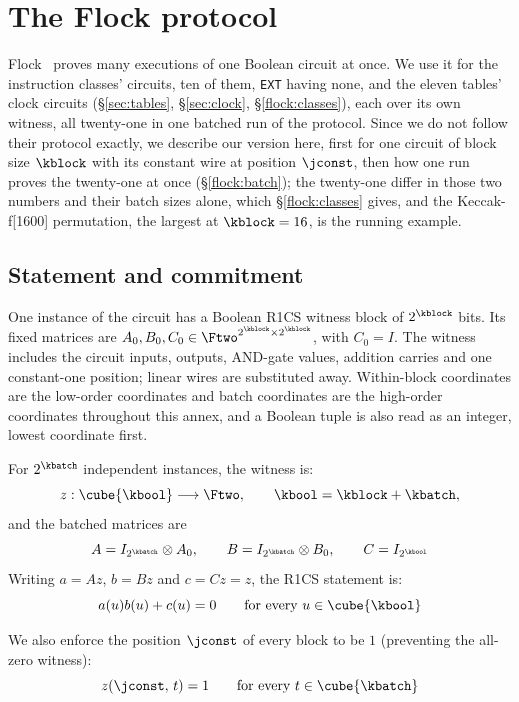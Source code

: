 \section{The Flock protocol}\label{annex:flock}

Flock~\cite{Flock26} proves many executions of one Boolean circuit at once. We use it for the instruction classes' circuits, ten of them, \texttt{EXT} having none, and the eleven tables' clock circuits (\S\ref{sec:tables}, \S\ref{sec:clock}, \S\ref{flock:classes}), each over its own witness, all twenty-one in one batched run of the protocol. Since we do not follow their protocol exactly, we describe our version here, first for one circuit of block size $\kblock$ with its constant wire at position $\jconst$, then how one run proves the twenty-one at once (\S\ref{flock:batch}); the twenty-one differ in those two numbers and their batch sizes alone, which \S\ref{flock:classes} gives, and the Keccak-f[1600] permutation, the largest at $\kblock=16$, is the running example.

\subsection{Statement and commitment}\label{flock:statement}

One instance of the circuit has a Boolean R1CS witness block of $2^{\kblock}$ bits. Its fixed matrices are $A_0,B_0,C_0\in\Ftwo^{2^{\kblock}\times 2^{\kblock}}$, with $C_0=I$. The witness includes the circuit inputs, outputs, AND-gate values, addition carries and one constant-one position; linear wires are substituted away. Within-block coordinates are the low-order coordinates and batch coordinates are the high-order coordinates throughout this annex, and a Boolean tuple is also read as an integer, lowest coordinate first.

For $2^{\kbatch}$ independent instances, the witness is:
\[
z:\cube{\kbool}\longrightarrow\Ftwo,\qquad \kbool=\kblock+\kbatch,
\]
and the batched matrices are
\[
A=I_{2^{\kbatch}}\otimes A_0,\qquad B=I_{2^{\kbatch}}\otimes B_0,\qquad C=I_{2^{\kbool}}
\]
Writing $a=Az$, $b=Bz$ and $c=Cz=z$, the R1CS statement is:
\begin{equation}\label{flock:eq:r1cs}
a(u)b(u)+c(u)=0\qquad\text{for every }u\in\cube{\kbool}
\end{equation}

We also enforce the position $\jconst$ of every block to be $1$ (preventing the all-zero witness):
\begin{equation}\label{flock:eq:const-one}
z(\jconst,\,t)=1\qquad\text{for every }t\in\cube{\kbatch}
\end{equation}

